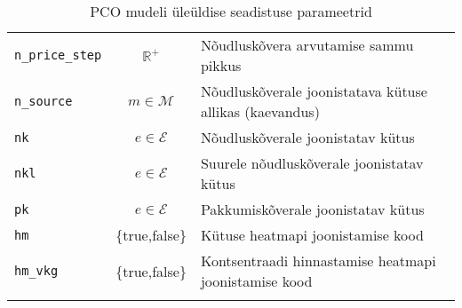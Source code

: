 \documentclass[10pt,a4paper]{article}
\begin{document}
\begin{table}
\begin{tabular}{l c l}
\texttt{n\_price\_step}&$\mathbb{R}^+$  & Nõudluskõvera arvutamise sammu pikkus \\
\texttt{n\_source} &  $m \in \mathcal{M}$  & Nõudluskõverale joonistatava kütuse allikas (kaevandus)\\
\texttt{nk}        &  $e \in \mathcal{E}$  & Nõudluskõverale joonistatav kütus \\
\texttt{nkl}       &  $e \in \mathcal{E}$  & Suurele nõudluskõverale joonistatav kütus \\
\texttt{pk}        &  $e \in \mathcal{E}$  & Pakkumiskõverale joonistatav kütus \\
\texttt{hm}        &  \{true,false\}& Kütuse heatmapi joonistamise kood \\
\texttt{hm\_vkg}   &  \{true,false\}& Kontsentraadi hinnastamise heatmapi joonistamise kood \\   
\\  
\end{tabular}
\caption{PCO mudeli üleüldise seadistuse parameetrid}
\label{tab:conf_gen}
\end{table}
\end{document}
